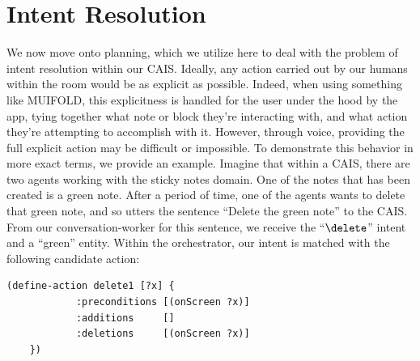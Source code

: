 \section{Intent Resolution}

We now move onto planning, which we utilize here to deal with the problem of intent
resolution within our CAIS.
Ideally, any action carried out by our humans within the room would be as explicit
as possible. Indeed, when using something like MUIFOLD, this explicitness is handled for
the user under the hood by the app, tying together what note or block they're interacting
with, and what action they're attempting to accomplish with it. However, through voice,
providing the full explicit action may be difficult or impossible. To demonstrate this
behavior in more exact terms, we provide an example. Imagine that within a CAIS, there
are two agents working with the sticky notes domain. One of the notes that has been
created is a green note. After a period of time, one of the agents wants to delete that
green note, and so utters the sentence ``Delete the green note'' to the CAIS. From our
conversation-worker for this sentence, we receive the ``$\delete$'' intent and a ``green''
entity. Within the orchestrator, our intent is matched with the following candidate action:

\begin{lstlisting}[caption=delete action for the note,label={lst:intent_strips}]
    (define-action delete1 [?x] {
            :preconditions [(onScreen ?x)]
            :additions     []
            :deletions     [(onScreen ?x)]
    })
\end{lstlisting}

